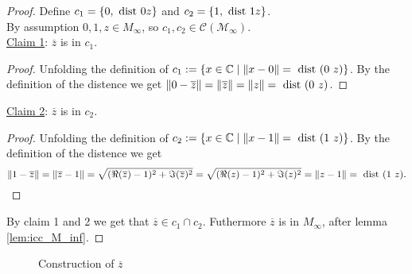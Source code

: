 \begin{proof}
    Define $c_1 = \{0,\text{ dist } 0 z\}$ and $c_2 = \{1,\text{ dist } 1 z\}$.\\
    By assumption $0, 1, z \in M_{\infty}$, so $c_1, c_2 \in \mathcal{C(M_{\infty})}$.\\
    \underline{Claim 1}: $\overline{z}$ is in $c_1$.
    \begin{proof}
        Unfolding the definition of $c_1:=\{x\in\mathbb{C} \mid\|x-0\|=\dist (0\ z)\}$.
        By the definition of the distence we get $\|0-\overline{z}\| = \|\overline{z}\| =\|z\| = \text{ dist } (0\ z)$.
    \end{proof}
    \underline{Claim 2}: $\overline{z}$ is in $c_2$.
    \begin{proof}
        Unfolding the definition of $c_2:=\{x\in\mathbb{C} \mid\|x-1\|=\dist (1\ z)\}$.
        By the definition of the distence we get $$\|1-\overline{z}\| = \|\overline{z}-1\| = \sqrt{(\Re(\overline{z})-1)^2 + \Im(\overline{z})^2} = \sqrt{(\Re(z)-1)^2 + \Im(z)^2} = \|z-1\|=\text{ dist } (1\ z).$$
    \end{proof}
    By claim 1 and 2 we get that $\overline{z} \in c_1 \cap c_2$. Futhermore  $\overline{z} $ is in $M_{\infty}$, after lemma \ref{lem:icc_M_inf}.
\end{proof}
\begin{figure}[h]
    \centering
    \caption{Construction of $\overline{z}$}
    \label{Fig.3}
\end{figure}



